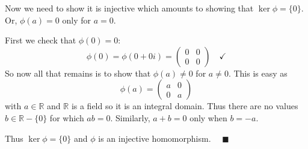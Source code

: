 \documentclass[12pt]{article}
\newcommand{\R}{\mathbb{R}}
\newcommand{\qed}{\quad \blacksquare}
\begin{document}
\begin{enumerate}
            Now we need to show it is injective which amounts to showing that $\ker \phi = \{0\}$. Or, $\phi(a) = 0$ only for $a = 0$. 

            First we check that $\phi(0) = 0$:
            \[\phi(0) = \phi(0 + 0i) = \begin{pmatrix}
                0 & 0\\
                0 & 0
            \end{pmatrix} \quad \checkmark\]
            So now all that remains is to show that $\phi(a) \neq 0$ for $a \neq 0$. This is easy as 
            \[\phi(a) = \begin{pmatrix}
                a & 0\\
                0 & a
            \end{pmatrix}\]
            with $a \in \R$ and $\R$ is a field so it is an integral domain. Thus there are no values $b \in \R - \{0\}$ for which $ab = 0$. Similarly, $a + b = 0$ only when $b = -a$. 
            
            Thus $\ker \phi = \{0\}$ and $\phi$ is an injective homomorphism. $\qed$
        \end{enumerate}  
    \color{black}
\pagebreak
\end{document}
